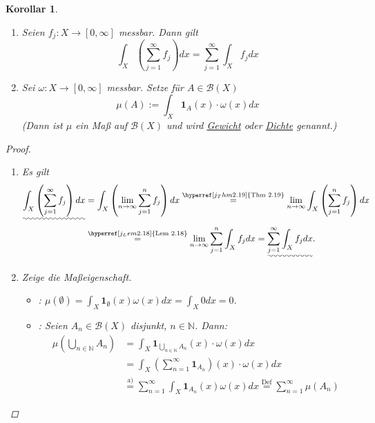 \documentclass[a4paper]{scrreprt}
\newcommand{\doubleOne}{\textbf{1}}
\newcommand{\N}{\mathbb{N}}
\newcommand{\Borel}{\mathcal{B}}
\newcommand{\toInf}{\rightarrow \infty}
\newcommand{\limToInf}[1]{\lim_{#1 \toInf}}
\newcommand{\jlabel}[1]{\label{j_#1}}
\newcommand{\jshortlink}[1]{\jhyperref{#1}{\text{#1}}}
\newcommand{\jhyperref}[2]{\hyperref[j_#1]{#2}}
\newcommand{\jabb}[3]{ #1: #2 \rightarrow #3 }
\theoremstyle{plain}
\newtheorem{kor}[thm]{Korollar}
\theoremstyle{definition}
\begin{document}
{{{\jlabel{Kor 2.20}
\begin{kor}
    \begin{enumerate}
        \item
            Seien $\jabb{f_j}{X}{[0,\infty]}$ messbar. Dann gilt
            \begin{displaymath}
                \int_X \left( \sum_{j=1}^\infty f_j \right) dx = \sum_{j=1}^\infty \int_X f_j dx
            \end{displaymath}
        \item
            Sei $\jabb{\omega}{X}{[0,\infty]}$ messbar. Setze für $A\in\Borel(X)$
            \begin{displaymath}
                \mu(A) := \int_X \doubleOne_{A}(x)\cdot \omega(x) dx
            \end{displaymath}
            (Dann ist $\mu$ ein Maß auf $\Borel(X)$ und wird \uline{Gewicht} oder \uline{Dichte} genannt.)
    \end{enumerate}
    \begin{proof}
        \begin{enumerate}
            \item Es gilt
                \begin{displaymath}
                    \begin{split}
                        \uwave{\int_X \left( \sum_{j=1}^\infty f_j \right) dx} &= \int_X\left( \limToInf{n} \sum_{j=1}^n f_j \right) dx \overset{\jshortlink{Thm 2.19}}{=} \limToInf{n} \int_X \left( \sum_{j=1}^n f_j \right)dx\\
                        &\overset{\jshortlink{Lem 2.18}}{=} \limToInf{n} \sum_{j=1}^n \int_X f_j dx = \uwave{\sum_{j=1}^\infty \int_X f_j dx}.
                    \end{split}
                \end{displaymath}
            \item Zeige die Maßeigenschaft.
                \begin{itemize}
                    \item[(M1)]: $\mu(\emptyset) = \int_X \doubleOne_\emptyset(x) \omega(x) dx = \int_X 0 dx = 0$.
                    \item[(M2)]: Seien $A_n \in \Borel(X)$ disjunkt, $n\in\N$. Dann:
                    \begin{displaymath}
                        \begin{split}
                            \mu \left(\bigcup_{n\in\N} A_n \right) &= \int_X \doubleOne_{\bigcup_{n\in\N} A_n}(x)\cdot \omega(x) dx \\
                            &= \int_X \left(\sum_{n=1}^\infty \doubleOne_{A_n}\right)(x) \cdot \omega(x) dx\\
                            &\overset{\text{a)}}{=} \sum_{n=1}^\infty \int_X \doubleOne_{A_n}(x)\omega(x) dx \overset{\text{Def}}{=} \sum_{n=1}^\infty \mu(A_n)
                        \end{split}
                    \end{displaymath}
                \end{itemize}


\end{enumerate}
\end{proof}
\end{kor}}}}
\end{document}
